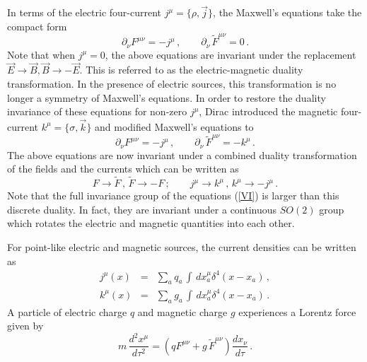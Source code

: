In terms of the electric four-current $j^{\mu}=\{\rho,\vec{j}\}$, the
Maxwell's equations take the compact form
\begin{equation}
\partial_\nu F^{\mu\nu}=-j^\mu\,,\qquad\partial_\nu\,\widetilde
F^{\mu\nu}=0\,. \label{V}
\end{equation}
Note that when $j^\mu =0$, the above equations are invariant under the
replacement $\vec{E} \rightarrow \vec{B}, \vec{B} \rightarrow
-\vec{E}$. This is referred to as the electric-magnetic duality
transformation. In the presence of electric sources, this
transformation is no longer a symmetry of Maxwell's equations. In
order to restore the duality invariance of these equations for
non-zero $j^{\mu}$, Dirac \cite{Dirac} introduced the magnetic
four-current $k^{\mu}=\{\sigma ,\vec{k}\}$ and modified Maxwell's
equations to
\begin{equation}
\partial_\nu F^{\mu\nu}=-j^\mu\,,\qquad\partial_\nu\,
\widetilde F^{\mu\nu}= -k^\mu \,.   
\label{VI}
\end{equation}
The above equations are now invariant under a combined duality
transformation of the fields and the currents which can be written as 
\begin{equation}
F\rightarrow \widetilde F\,,\,\widetilde F\rightarrow-F\,;\qquad 
j^\mu\rightarrow k^\mu\,,\, k^\mu\rightarrow -j^\mu\,.
\label{emduality}
\end{equation}
Note that the full invariance group of the equations (\ref{VI}) is
larger than this discrete duality. In fact, they are invariant under a
continuous $SO(2)$ group which rotates the electric and magnetic
quantities into each other. 

For point-like electric and magnetic sources, the current densities 
can be written as 
\begin{eqnarray}
j^{\mu}(x) & = & \sum_{a} q_{a} \, \int \, dx_{a}^{\mu}
\delta^{4} (x - x_{a})\,, \nonumber \\
k^{\mu}(x) & = & \sum_{a} g_{a} \, \int \, dx_{a}^{\mu}
\delta^{4} (x - x_{a})\,.\nonumber
\end{eqnarray}
A particle of electric charge $q$ and magnetic charge $g$ experiences
a Lorentz force given by
$$
m\,\frac{d^2x^\mu}{d\tau^2}=(q F^{\mu\nu}+g\, \widetilde F^{\mu\nu})
\frac{dx_\nu}{d\tau}\,.
$$

